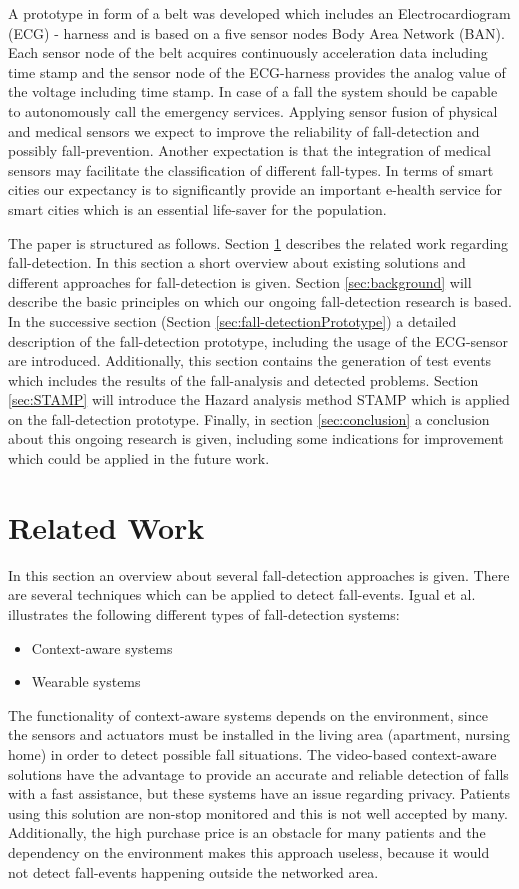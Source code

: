 \documentclass[review]{elsarticle}
\begin{document}
A prototype in form of a belt was developed which includes an Electrocardiogram (ECG) - harness and is based on a five sensor nodes Body Area Network (BAN). Each sensor node of the belt acquires continuously acceleration data including time stamp and the sensor node of the ECG-harness provides the analog value of the voltage including time stamp. In case of a fall the system should be capable to autonomously call the emergency services. Applying sensor fusion of physical and medical sensors we expect to improve the reliability of fall-detection and possibly fall-prevention. Another expectation is that the integration of medical sensors may facilitate the classification of different fall-types. In terms of smart cities our expectancy is to significantly provide an important e-health service for smart cities which is an essential life-saver for the population.

The paper is structured as follows. Section \ref{sec:relatedwork} describes the related work regarding fall-detection. In this section a short overview about existing solutions and different approaches for fall-detection is given. Section \ref{sec:background} will describe the basic principles on which our ongoing fall-detection research is based. In the successive section (Section \ref{sec:fall-detectionPrototype}) a detailed description of the fall-detection prototype, including the usage of the ECG-sensor are introduced. Additionally, this section contains the generation of test events which includes the results of the fall-analysis and detected problems. Section \ref{sec:STAMP} will introduce the Hazard analysis method STAMP which is applied on the fall-detection prototype.
Finally, in section \ref{sec:conclusion} a conclusion about this ongoing research is given, including some indications for improvement which could be applied in the future work.

\section{Related Work}
\label{sec:relatedwork}
In this section an overview about several fall-detection approaches is given. There are several techniques which can be applied to detect fall-events. Igual et al. \cite{Igual2013} illustrates the following different types of fall-detection  systems:
\begin{itemize}
	\item Context-aware systems
	\item Wearable systems
\end{itemize}
The functionality of context-aware systems depends on the environment, since the sensors and actuators must be installed in the living area (apartment, nursing home) in order to detect possible fall situations. The video-based context-aware solutions have the advantage to provide an accurate and reliable detection of falls with a fast assistance, but these systems have an issue regarding privacy. Patients using this solution are non-stop monitored and this is not well accepted by many. Additionally, the high purchase price is an obstacle for many patients and the dependency on the environment makes this approach useless, because it would not detect fall-events happening outside the networked area.
\end{document}

